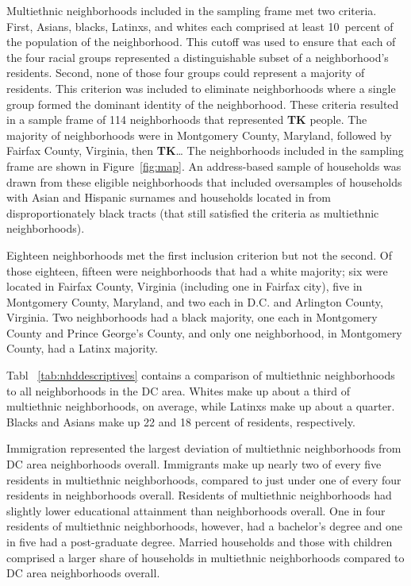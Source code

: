 \documentclass{baderart}
\begin{document}
Multiethnic neighborhoods included in the sampling frame met two criteria. First, Asians, blacks, Latinxs, and whites each comprised at least 10~percent of the population of the neighborhood. This cutoff was used to ensure that each of the four racial groups represented a distinguishable subset of a neighborhood's residents. Second, none of those four groups could represent a majority of residents. This criterion was included to eliminate neighborhoods where a single group formed the dominant identity of the neighborhood. These criteria resulted in a sample frame of 114 neighborhoods that represented \textbf{TK} people. The majority of neighborhoods were in Montgomery County, Maryland, followed by Fairfax County, Virginia, then \textbf{TK}\ldots{} The neighborhoods included in the sampling frame are shown in Figure~\ref{fig:map}. An address-based sample of households was drawn from these eligible neighborhoods that included oversamples of households with Asian and Hispanic surnames and households located in from disproportionately black tracts (that still satisfied the criteria as multiethnic neighborhoods).

Eighteen neighborhoods met the first inclusion criterion but not the second. Of those eighteen, fifteen were neighborhoods that had a white majority; six were located in Fairfax County, Virginia (including one in Fairfax city), five in Montgomery County, Maryland, and two each in D.C. and Arlington County, Virginia. Two neighborhoods had a black majority, one each in Montgomery County and Prince George's County, and only one neighborhood, in Montgomery County, had a Latinx majority.

Tabl~ \ref{tab:nhddescriptives} contains a comparison of multiethnic neighborhoods to all neighborhoods in the DC area. Whites make up about a third of multiethnic neighborhoods, on average, while Latinxs make up about a quarter. Blacks and Asians make up 22 and 18 percent of residents, respectively.


Immigration represented the largest deviation of multiethnic neighborhoods from DC area neighborhoods overall. Immigrants make up nearly two of every five residents in multiethnic neighborhoods, compared to just under one of every four residents in neighborhoods overall. Residents of multiethnic neighborhoods had slightly lower educational attainment than neighborhoods overall. One in four residents of multiethnic neighborhoods, however, had a bachelor's degree and one in five had a post-graduate degree. Married households and those with children comprised a larger share of households in multiethnic neighborhoods compared to DC area neighborhoods overall.
\end{document}
